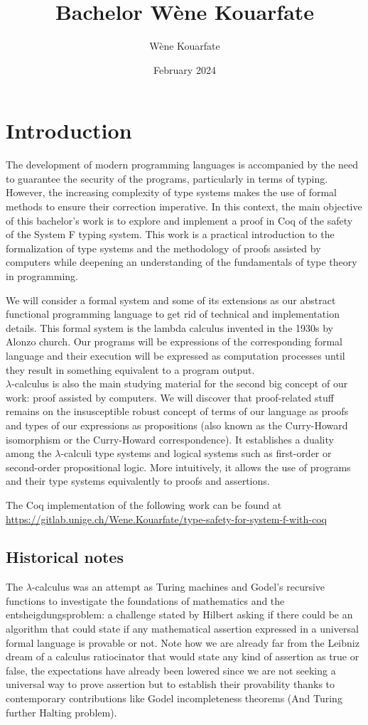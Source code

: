 \documentclass{article}
\title{Bachelor Wène Kouarfate}
\author{Wène Kouarfate}
\date{February 2024}
\begin{document}
\maketitle

\tableofcontents
\newpage

\section{Introduction}
The development of modern programming languages is accompanied by the need to guarantee the security of the programs, particularly in terms of typing. However, the increasing complexity of type systems makes the use of formal methods
 to ensure their correction imperative. In this context, the main objective of this bachelor's work is to explore and implement a proof in Coq of the safety of the System F typing system. This work is a practical introduction to the formalization of type systems and the methodology of proofs assisted by computers while deepening an understanding of the fundamentals of type theory in programming.\par
We will consider a formal system and some of its extensions as our abstract functional programming language to get rid of technical and implementation details. This formal system is the lambda calculus invented in the 1930s by Alonzo church. Our programs will be expressions of the corresponding formal language and their execution will be expressed as computation processes until they result in something equivalent to a program output.\\
$\lambda$-calculus is also the main studying material for the second big concept of our work: proof assisted by computers. We will discover that proof-related stuff remains on the insusceptible robust concept of terms of our language as proofs and types of our expressions as propositions (also known as the Curry-Howard isomorphism or the Curry-Howard correspondence). It establishes a duality among the $\lambda$-calculi type systems and logical systems such as first-order or second-order propositional logic. More intuitively, it allows the use of programs and their type systems equivalently to proofs and assertions.\par
The Coq implementation of the following work can be found at \url{https://gitlab.unige.ch/Wene.Kouarfate/type-safety-for-system-f-with-coq}
\subsection{Historical notes}
The $\lambda$-calculus was an attempt as Turing machines and Godel's recursive functions to investigate the foundations of mathematics and the entsheigdungsproblem: a challenge stated by Hilbert asking if there could be an algorithm that could state if any mathematical assertion expressed in a universal formal language is provable or not. Note how we are already far from the Leibniz dream of a calculus ratiocinator that would state any kind of assertion as true or false, the expectations have already been lowered since we are not seeking a universal way to prove assertion but to establish their provability thanks to contemporary contributions like Godel incompleteness theorems (And Turing further Halting problem).
\end{document}
